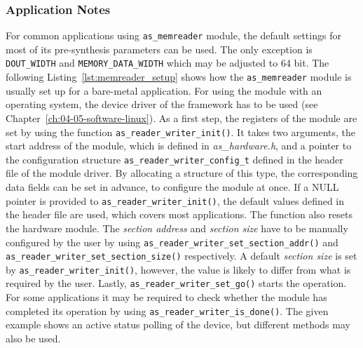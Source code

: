 \subsubsection{Application Notes}
For common applications using \texttt{as\_memreader} module, the default settings for most of its pre-synthesis parameters can be used.
The only exception is \texttt{DOUT\_WIDTH} and \texttt{MEMORY\_DATA\_WIDTH} which may be adjusted to 64 bit.
The following Listing~\ref{lst:memreader_setup} shows how the \texttt{as\_memreader} module is usually set up for a bare-metal application.
For using the module with an operating system, the device driver of the \asterics framework has to be used (see Chapter~\ref{ch:04-05-software-linux}).
As a first step, the registers of the module are set by using the function \texttt{as\_reader\_writer\_init()}.
It takes two arguments, the start address of the module, which is defined in \textit{as\_hardware.h}, and a pointer to the configuration structure \texttt{as\_reader\_writer\_config\_t} defined in the header file of the module driver.
By allocating a structure of this type, the corresponding data fields can be set in advance, to configure the module at once.
If a NULL pointer is provided to \texttt{as\_reader\_writer\_init()}, the default values defined in the header file are used, which covers most applications.
The function also resets the hardware module.
The \textit{section address} and \textit{section size} have to be manually configured by the user by using \texttt{as\_reader\_writer\_set\_section\_addr()} and \texttt{as\_reader\_writer\_set\_section\_size()} respectively.
A default \textit{section size} is set by \texttt{as\_reader\_writer\_init()}, however, the value is likely to differ from what is required by the user.
Lastly, \texttt{as\_reader\_writer\_set\_go()} starts the operation.
For some applications it may be required to check whether the module has completed its operation by using \texttt{as\_reader\_writer\_is\_done()}.
The given example shows an active status polling of the device, but different methods may also be used.


